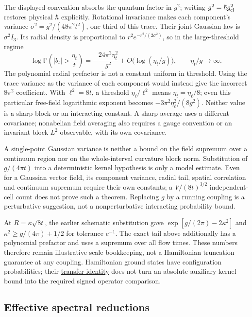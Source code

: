 \documentclass[11pt,a4paper]{article}
\begin{document}
The displayed convention absorbs the quantum factor in \(g^2\); writing
\(g^2=\hbar g_{\rm cl}^2\) restores physical \(\hbar\) explicitly.
Rotational invariance makes each component's variance
\(\sigma^2=g^2/(48\pi^2t^2)\), one third of this trace. Their joint
Gaussian law is \(\sigma^2 I_3\). Its radial density is proportional to
\(r^2e^{-r^2/(2\sigma^2)}\), so in the large-threshold regime
\[\log\mathbb P\left(|b_t|>\frac{\eta_t}{t}\right)
=-\frac{24\pi^2\eta_t^2}{g^2}
+O\big(\log(\eta_t/g)\big),\qquad \eta_t/g\to\infty.\] The polynomial
radial prefactor is not a constant uniform in threshold. Using the trace
variance as the variance of each component would instead give the
incorrect \(8\pi^2\) coefficient. With \(\ell^2=8t\), a threshold
\(\eta_\ell/\ell^2\) means \(\eta_t=\eta_\ell/8\); even this particular
free-field logarithmic exponent becomes \(-3\pi^2\eta_\ell^2/(8g^2)\).
Neither value is a sharp-block or an interacting constant. A sharp
average uses a different covariance; nonabelian field averaging also
requires a gauge convention or an invariant block-\(L^2\) observable,
with its own covariance.

A single-point Gaussian variance is neither a bound on the field
supremum over a continuum region nor on the whole-interval curvature
block norm. Substitution of \(g/(4\pi t)\) into a deterministic kernel
hypothesis is only a model estimate. Even for a Gaussian vector field,
its component variance, radial tail, spatial correlation and continuum
supremum require their own constants; a \(V/(8t)^{3/2}\)
independent-cell count does not prove such a theorem. Replacing \(g\) by
a running coupling is a perturbative suggestion, not a nonperturbative
interacting probability bound.

At \(R=\kappa\sqrt{8t}\), the earlier schematic substitution gave
\(\exp[g/(2\pi)-2\kappa^2]\) and \(\kappa^2\ge g/(4\pi)+1/2\) for
tolerance \(e^{-1}\). The exact tail above additionally has a polynomial
prefactor and uses a supremum over all flow times. These numbers
therefore remain illustrative scale bookkeeping, not a Hamiltonian
truncation guarantee at any coupling. Hamiltonian ground states have
configuration probabilities; their
\href{ground-state-measure-transfer.md}{transfer identity} does not turn
an absolute auxiliary kernel bound into the required signed operator
comparison.

\hypertarget{effective-spectral-reductions}{%
\subsection{Effective spectral
reductions}\label{effective-spectral-reductions}}
\end{document}
